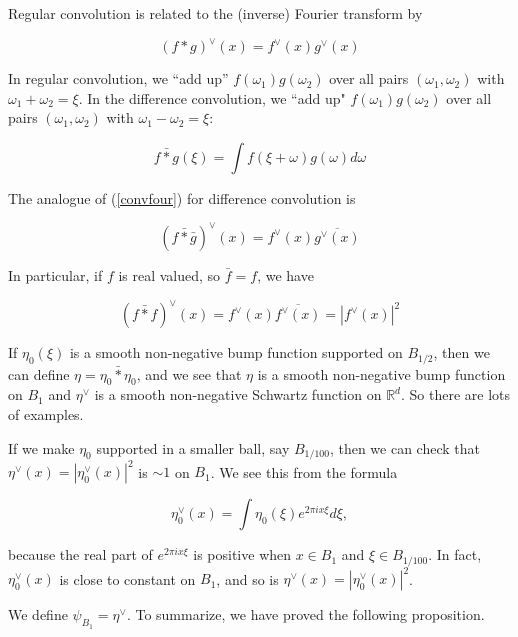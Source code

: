 \documentclass{amsart}
\newcommand{\RR}{\mathbb{R}}
\begin{document}
Regular convolution is related to the (inverse) Fourier transform by

\begin{equation} \label{convfour}
(f * g)^\vee(x) = f^\vee(x) g^\vee(x)
\end{equation}

In regular convolution,  we ``add up'' $f(\omega_1) g(\omega_2)$ over all pairs $(\omega_1, \omega_2)$ with $\omega_1 + \omega_2 = \xi$.  In the difference convolution,  we ``add up" $f(\omega_1) g(\omega_2)$ over all pairs $(\omega_1, \omega_2)$ with $\omega_1 - \omega_2 = \xi$:


\begin{equation} \label{defconvd}
f \bar * g(\xi) = \int f(\xi + \omega) g(\omega) d \omega
\end{equation}

The analogue of (\ref{convfour}) for difference convolution is 

\begin{equation} \label{convfourd}
(f \bar * \bar g)^\vee(x) = f^\vee(x) \overline{g^\vee(x)}
\end{equation}

In particular,  if $f$ is real valued,  so $\bar f = f$,  we have


\begin{equation} \label{convfourd2}
(f \bar * f)^\vee(x) = f^\vee(x) \overline{f^\vee(x)} = | f^\vee(x)|^2
\end{equation}

If $\eta_0(\xi)$ is a smooth non-negative bump function supported on $B_{1/2}$,  then we can define $\eta =  \eta_0 \bar * \eta_0$,  and we see that $\eta$ is a smooth non-negative bump function on $B_1$ and $\eta^\vee$ is a smooth non-negative Schwartz function on $\RR^d$.   So there are lots of examples.

If we make $\eta_0$ supported in a smaller ball, say $B_{1/100}$,  then we can check that $\eta^\vee(x) = |\eta_0^\vee(x)|^2$ is $\sim 1$ on $B_1$.   We see this from the formula

$$ \eta_0^\vee(x) = \int \eta_0(\xi) e^{2 \pi i x \xi} d \xi,  $$

\noindent 

because the real part of $e^{2 \pi i x \xi}$ is positive when $x \in B_1$ and $\xi \in B_{1/100}$.   In fact, $\eta_0^\vee(x)$ is close to constant on $B_1$, and so is $\eta^\vee(x) = |\eta_0^\vee(x)|^2$. 

We define $\psi_{B_1} = \eta^\vee$.   To summarize,  we have proved the following proposition.
\end{document}
